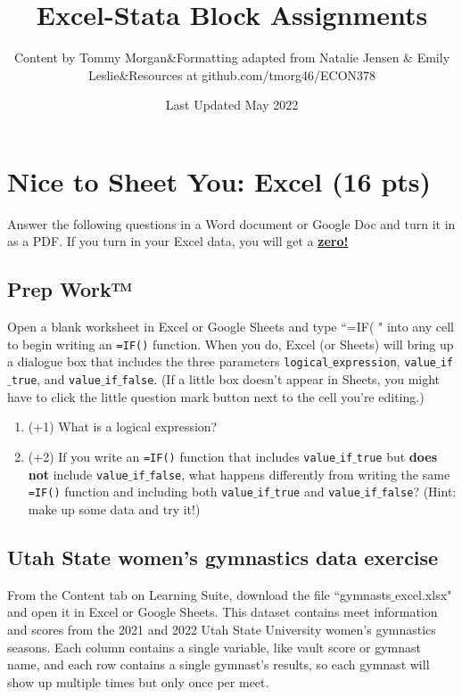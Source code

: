 \documentclass[12pt, oneside]{article}
\title{Excel-Stata Block Assignments}
\author{Content by Tommy Morgan&Formatting adapted from Natalie Jensen $\&$ Emily Leslie&Resources at github.com/tmorg46/ECON378}
\date{Last Updated May 2022}
\begin{document}
\maketitle

\section{Nice to Sheet You: Excel (16 pts)}
Answer the following questions in a Word document or Google Doc and turn it in as a PDF. If you turn in your Excel data, you will get a \underline{\textbf{zero!}}

\subsection{Prep Work™}

\item   Open a blank worksheet in Excel or Google Sheets and type ``=IF( " into any cell to begin writing an \texttt{=IF()} function. When you do, Excel (or Sheets) will bring up a dialogue box that includes the three parameters \texttt{logical$\_$expression}, \texttt{value$\_$if$\_$true}, and \texttt{value$\_$if$\_$false}. (If a little box doesn't appear in Sheets, you might have to click the little question mark button next to the cell you're editing.)
\begin{enumerate}
\item   (+1)    What is a logical expression?
\item   (+2)    If you write an \texttt{=IF()} function that includes  \texttt{value$\_$if$\_$true} but \textbf{does not} include \texttt{value$\_$if$\_$false}, what happens differently from writing the same \texttt{=IF()} function and including both \texttt{value$\_$if$\_$true} and \texttt{value$\_$if$\_$false}? (Hint: make up some data and try it!)
\end{enumerate}

\subsection{Utah State women's gymnastics data exercise} 
From the Content tab on Learning Suite, download the file ``gymnasts$\_$excel.xlsx" and open it in Excel or Google Sheets. This dataset contains meet information and scores from the 2021 and 2022 Utah State University women's gymnastics seasons. Each column contains a single variable, like vault score or gymnast name, and each row contains a single gymnast's results, so each gymnast will show up multiple times but only once per meet.
\end{document}
